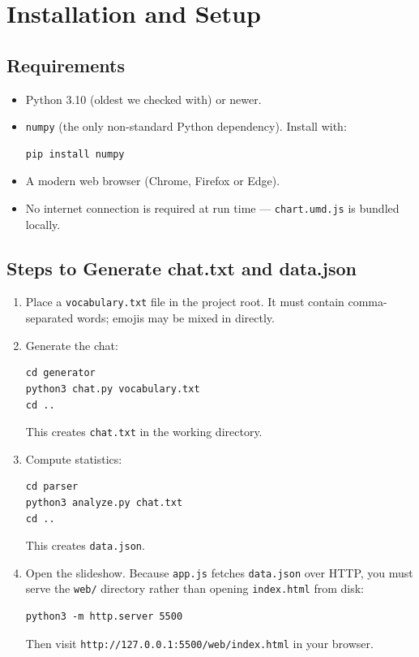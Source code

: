 \documentclass[12pt]{article}
\begin{document}
\section{Installation and Setup}

\subsection{Requirements}

\begin{itemize}
    \item Python 3.10 (oldest we checked with) or newer.
    \item \texttt{numpy} (the only non-standard Python dependency). Install
    with:
\begin{verbatim}
pip install numpy
\end{verbatim}
    \item A modern web browser (Chrome, Firefox or Edge).
    \item No internet connection is required at run time --- \texttt{chart.umd.js}
    is bundled locally.
\end{itemize}

\subsection{Steps to Generate chat.txt and data.json}

\begin{enumerate}
    \item Place a \texttt{vocabulary.txt} file in the project root. It must
    contain comma-separated words; emojis may be mixed in directly.
    \item Generate the chat:
\begin{verbatim}
cd generator
python3 chat.py vocabulary.txt
cd ..
\end{verbatim}
    This creates \texttt{chat.txt} in the working directory.
    \item Compute statistics:
\begin{verbatim}
cd parser
python3 analyze.py chat.txt
cd ..
\end{verbatim}
    This creates \texttt{data.json}.
    \item Open the slideshow. Because \texttt{app.js} fetches \texttt{data.json}
    over HTTP, you must serve the \texttt{web/} directory rather than opening
    \texttt{index.html} from disk:
\begin{verbatim}
python3 -m http.server 5500
\end{verbatim}
    Then visit \texttt{http://127.0.0.1:5500/web/index.html} in your browser.
\end{enumerate}
\end{document}
